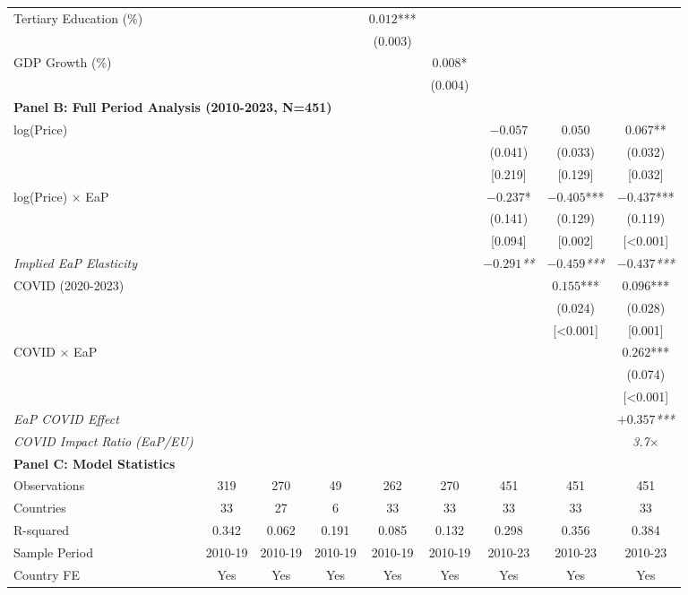 \begin{table}[htbp]
\begin{tabular}{@{}lcccccccc@{}}
\addlinespace
Tertiary Education (\%) & & & & $0.012$*** & & & & \\
& & & & (0.003) & & & & \\
\addlinespace
GDP Growth (\%) & & & & & $0.008$* & & & \\
& & & & & (0.004) & & & \\
\midrule
\multicolumn{9}{l}{\textbf{Panel B: Full Period Analysis (2010-2023, N=451)}} \\
\midrule
log(Price) & & & & & & $-0.057$ & $0.050$ & $0.067$** \\
& & & & & & (0.041) & (0.033) & (0.032) \\
& & & & & & [0.219] & [0.129] & [0.032] \\
\addlinespace
log(Price) $\times$ EaP & & & & & & $-0.237$* & $-0.405$*** & $-0.437$*** \\
& & & & & & (0.141) & (0.129) & (0.119) \\
& & & & & & [0.094] & [0.002] & [<0.001] \\
\addlinespace
\textit{Implied EaP Elasticity} & & & & & & \textit{$-0.291$**} & \textit{$-0.459$***} & \textit{$-0.437$***} \\
\addlinespace
COVID (2020-2023) & & & & & & & $0.155$*** & $0.096$*** \\
& & & & & & & (0.024) & (0.028) \\
& & & & & & & [<0.001] & [0.001] \\
\addlinespace
COVID $\times$ EaP & & & & & & & & $0.262$*** \\
& & & & & & & & (0.074) \\
& & & & & & & & [<0.001] \\
\addlinespace
\textit{EaP COVID Effect} & & & & & & & & \textit{$+0.357$***} \\
\textit{COVID Impact Ratio (EaP/EU)} & & & & & & & & \textit{3.7$\times$} \\
\midrule
\multicolumn{9}{l}{\textbf{Panel C: Model Statistics}} \\
\midrule
Observations & 319 & 270 & 49 & 262 & 270 & 451 & 451 & 451 \\
Countries & 33 & 27 & 6 & 33 & 33 & 33 & 33 & 33 \\
R-squared & 0.342 & 0.062 & 0.191 & 0.085 & 0.132 & 0.298 & 0.356 & 0.384 \\
Sample Period & 2010-19 & 2010-19 & 2010-19 & 2010-19 & 2010-19 & 2010-23 & 2010-23 & 2010-23 \\
Country FE & Yes & Yes & Yes & Yes & Yes & Yes & Yes & Yes \\

\end{tabular}
\end{table}
